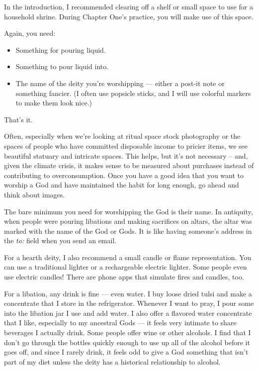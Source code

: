 \documentclass[
]{book}
\providecommand{\tightlist}{%
  \setlength{\itemsep}{0pt}\setlength{\parskip}{0pt}}
\begin{document}
In the introduction, I recommended clearing off a shelf or small space to use for a household shrine. During Chapter One's practice, you will make use of this space.

Again, you need:

\begin{itemize}
\tightlist
\item
  Something for pouring liquid.
\item
  Something to pour liquid into.
\item
  The name of the deity you're worshipping --- either a post-it note or something fancier. (I often use popsicle sticks, and I will use colorful markers to make them look nice.)
\end{itemize}

That's it.

Often, especially when we're looking at ritual space stock photography or the spaces of people who have committed disposable income to pricier items, we see beautiful statuary and intricate spaces. This helps, but it's not necessary -- and, given the climate crisis, it makes sense to be measured about purchases instead of contributing to overconsumption. Once you have a good idea that you want to worship a God and have maintained the habit for long enough, go ahead and think about images.

The bare minimum you need for worshipping the God is their name. In antiquity, when people were pouring libations and making sacrifices on altars, the altar was marked with the name of the God or Gods. It is like having someone's address in the \emph{to:} field when you send an email.

For a hearth deity, I also recommend a small candle or flame representation. You can use a traditional lighter or a rechargeable electric lighter. Some people even use electric candles! There are phone apps that simulate fires and candles, too.

For a libation, any drink is fine --- even water. I buy loose dried tulsi and make a concentrate that I store in the refrigerator. Whenever I want to pray, I pour some into the libation jar I use and add water. I also offer a flavored water concentrate that I like, especially to my ancestral Gods --- it feels very intimate to share beverages I actually drink. Some people offer wine or other alcohols. I find that I don't go through the bottles quickly enough to use up all of the alcohol before it goes off, and since I rarely drink, it feels odd to give a God something that isn't part of my diet unless the deity has a historical relationship to alcohol.
\end{document}
